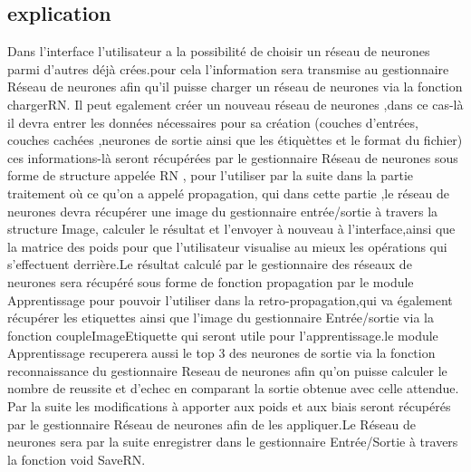 \documentclass{article}
\begin{document}
	\subsection{explication}
		
	Dans l'interface l'utilisateur a la possibilité de choisir un réseau de neurones parmi d'autres déjà crées.pour cela l'information sera transmise au gestionnaire Réseau de neurones afin qu'il puisse charger un réseau de neurones via la fonction chargerRN.
Il peut egalement créer un nouveau réseau de neurones ,dans ce cas-là il devra entrer les données nécessaires pour sa création (couches d'entrées, couches cachées ,neurones de sortie ainsi que les étiquèttes et le format du fichier) ces informations-là seront récupérées par le gestionnaire Réseau de neurones sous forme de structure appelée RN , pour l'utiliser par la suite dans la partie traitement où ce qu'on a appelé propagation, qui dans cette partie ,le réseau de neurones devra récupérer une image du gestionnaire entrée/sortie à travers la structure Image, calculer le résultat et l'envoyer à nouveau à l'interface,ainsi que la matrice des poids pour que l'utilisateur visualise au mieux les opérations qui s'effectuent derrière.Le résultat calculé par le gestionnaire des réseaux de neurones sera récupéré sous forme de fonction propagation par le module Apprentissage pour pouvoir l'utiliser dans la retro-propagation,qui va également récupérer les etiquettes ainsi que l'image du gestionnaire Entrée/sortie via la fonction coupleImageEtiquette qui seront utile pour l'apprentissage.le module Apprentissage recuperera aussi le top 3 des neurones de sortie via la fonction reconnaissance du gestionnaire Reseau de neurones afin qu'on puisse calculer le nombre de reussite et d'echec en comparant la sortie obtenue avec celle attendue.
Par la suite les modifications à apporter aux poids et aux biais seront récupérés par le gestionnaire Réseau de neurones afin de les appliquer.Le Réseau de neurones sera par la suite enregistrer dans le gestionnaire Entrée/Sortie à travers la fonction void SaveRN.
		
		
\end{document}
